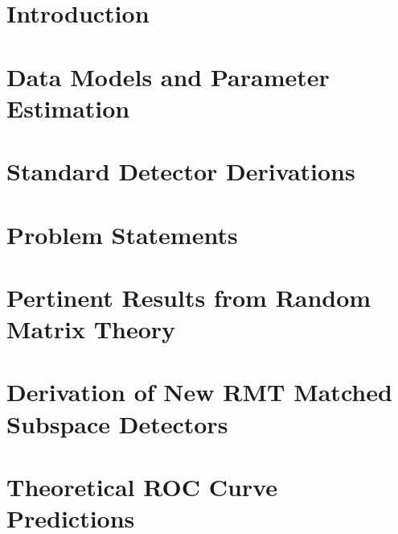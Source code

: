 \documentclass[10pt,twocolumn,twoside]{IEEEtran}
\begin{document}
\section{Introduction}\label{sec:intro}


\section{Data Models and Parameter Estimation}\label{sec:data_models}


\section{Standard Detector Derivations}\label{sec:std_detecs}


\section{Problem Statements}\label{sec:prob_state}


\section{Pertinent Results from Random Matrix Theory}\label{sec:rmt}


\section{Derivation of New RMT Matched Subspace Detectors}\label{sec:rmt_detecs}



%

\section{Theoretical ROC Curve Predictions}\label{sec:roc_theory}

\end{document}
